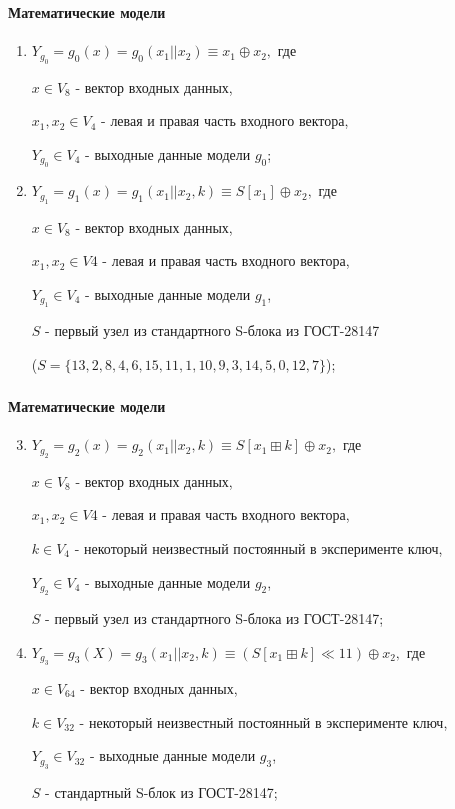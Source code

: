 \documentclass[notheorems]{beamer}
\theoremstyle{plain}
\theoremstyle{definition}
\theoremstyle{remark}
\begin{document}
\begin{frame}
	\frametitle{\secname}
	\framesubtitle{Математические модели}
	
\begin{enumerate}
	\item
	$Y_{g_0} = g_0(x) = g_0(x_1 || x_2)\equiv x_1 \oplus x_2,$ где
	
	$x \in V_{8}$ - вектор входных данных,
	
	$x_1, x_2 \in V_{4}$ - левая и правая часть входного вектора,
	
	$Y_{g_0} \in V_{4}$ - выходные данные модели $g_0$;
	\bigskip
	
	\item
	$Y_{g_1} = g_1(x) = g_1(x_1 || x_2, k) \equiv S[x_1] \oplus x_2,$ где
	
	$x \in V_{8}$ - вектор входных данных,
	
	$x_1, x_2 \in V{4}$ - левая и правая часть входного вектора,
	
	$Y_{g_1} \in V_{4}$ - выходные данные модели $g_1$,
	
	$S$ - первый узел из стандартного S-блока из ГОСТ-28147 
	
	($ S = \{13, 2, 8, 4, 6, 15, 11, 1, 10, 9, 3, 14, 5, 0, 12, 7\}$);
	\bigskip
	
	
\end{enumerate}
	
\end{frame}


\begin{frame}
	\frametitle{\secname}
	\framesubtitle{Математические модели}
	
	\begin{enumerate}
		\setcounter{enumi}{2}
		\item
		$Y_{g_2} = g_2(x) = g_2(x_1 || x_2, k) \equiv S[x_1 \boxplus k] \oplus x_2,$ где
		
		$x \in V_{8}$ - вектор входных данных,
		
		$x_1, x_2 \in V{4}$ - левая и правая часть входного вектора,
		
		$k \in V_{4}$ - некоторый неизвестный постоянный в эксперименте ключ,
		
		$Y_{g_2} \in V_{4}$ - выходные данные модели $g_2$,
		
		$S$ - первый узел из стандартного S-блока из ГОСТ-28147;
		
		\item 
		$Y_{g_3} = g_3(X) = g_3(x_1 || x_2, k) \equiv (S[x_1 \boxplus k] \ll 11) \oplus x_2,$ где
		
		$x \in V_{64}$ - вектор входных данных,
		
		$k \in V_{32}$ - некоторый неизвестный постоянный в эксперименте ключ,
		
		$Y_{g_3} \in V_{32}$ - выходные данные модели $g_3$,
		
		$S$ - стандартный S-блок из ГОСТ-28147;
		
		
	\end{enumerate}
	
\end{frame}
\end{document}
